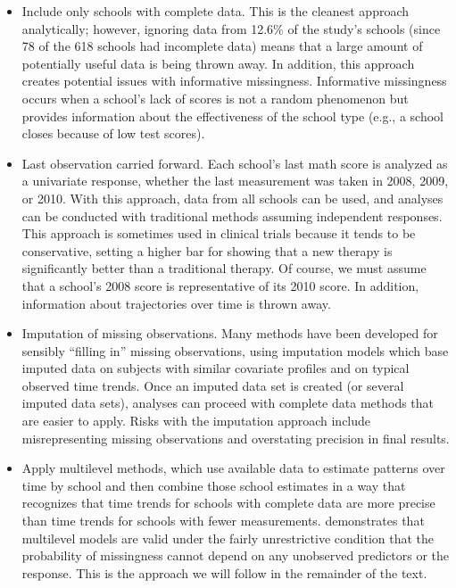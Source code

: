 \documentclass[
]{krantz}
\providecommand{\tightlist}{%
  \setlength{\itemsep}{0pt}\setlength{\parskip}{0pt}}
\begin{document}
\begin{itemize}
\tightlist
\item
  Include only schools with complete data. This is the cleanest approach analytically; however, ignoring data from 12.6\% of the study's schools (since 78 of the 618 schools had incomplete data) means that a large amount of potentially useful data is being thrown away. In addition, this approach creates potential issues with informative missingness. Informative missingness occurs when a school's lack of scores is not a random phenomenon but provides information about the effectiveness of the school type (e.g., a school closes because of low test scores).
\item
  Last observation carried forward. Each school's last math score is analyzed as a univariate response, whether the last measurement was taken in 2008, 2009, or 2010. With this approach, data from all schools can be used, and analyses can be conducted with traditional methods assuming independent responses. This approach is sometimes used in clinical trials because it tends to be conservative, setting a higher bar for showing that a new therapy is significantly better than a traditional therapy. Of course, we must assume that a school's 2008 score is representative of its 2010 score. In addition, information about trajectories over time is thrown away.
\item
  Imputation of missing observations. Many methods have been developed for sensibly ``filling in'' missing observations, using imputation models which base imputed data on subjects with similar covariate profiles and on typical observed time trends. Once an imputed data set is created (or several imputed data sets), analyses can proceed with complete data methods that are easier to apply. Risks with the imputation approach include misrepresenting missing observations and overstating precision in final results.
\item
  Apply multilevel methods, which use available data to estimate patterns over time by school and then combine those school estimates in a way that recognizes that time trends for schools with complete data are more precise than time trends for schools with fewer measurements. \citet{Laird1988} demonstrates that multilevel models are valid under the fairly unrestrictive condition that the probability of missingness cannot depend on any unobserved predictors or the response. This is the approach we will follow in the remainder of the text.
\end{itemize}
\end{document}
